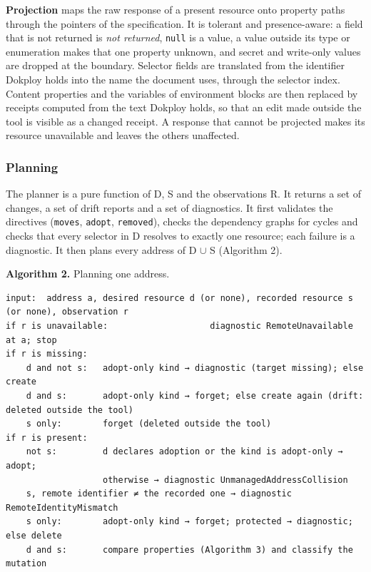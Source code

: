 \textbf{Projection} maps the raw response of a present resource onto property paths through the pointers
of the specification. It is tolerant and presence-aware: a field that is not returned is \emph{not
returned}, \texttt{null} is a value, a value outside its type or enumeration makes that one property unknown,
and secret and write-only values are dropped at the boundary. Selector fields are translated from the
identifier Dokploy holds into the name the document uses, through the selector index. Content
properties and the variables of environment blocks are then replaced by receipts computed from the
text Dokploy holds, so that an edit made outside the tool is visible as a changed receipt. A response
that cannot be projected makes its resource unavailable and leaves the others unaffected.

\subsubsection*{Planning}

The planner is a pure function of D, S and the observations R. It returns a set of changes, a set of
drift reports and a set of diagnostics. It first validates the directives (\texttt{moves}, \texttt{adopt},
\texttt{removed}), checks the dependency graphs for cycles and checks that every selector in D resolves to
exactly one resource; each failure is a diagnostic. It then plans every address of D \ensuremath{\cup} S
(Algorithm 2).

\textbf{Algorithm 2.} Planning one address.

\begin{lstlisting}
input:  address a, desired resource d (or none), recorded resource s (or none), observation r
if r is unavailable:                    diagnostic RemoteUnavailable at a; stop
if r is missing:
    d and not s:   adopt-only kind → diagnostic (target missing); else create
    d and s:       adopt-only kind → forget; else create again (drift: deleted outside the tool)
    s only:        forget (deleted outside the tool)
if r is present:
    not s:         d declares adoption or the kind is adopt-only → adopt;
                   otherwise → diagnostic UnmanagedAddressCollision
    s, remote identifier ≠ the recorded one → diagnostic RemoteIdentityMismatch
    s only:        adopt-only kind → forget; protected → diagnostic; else delete
    d and s:       compare properties (Algorithm 3) and classify the mutation
\end{lstlisting}

